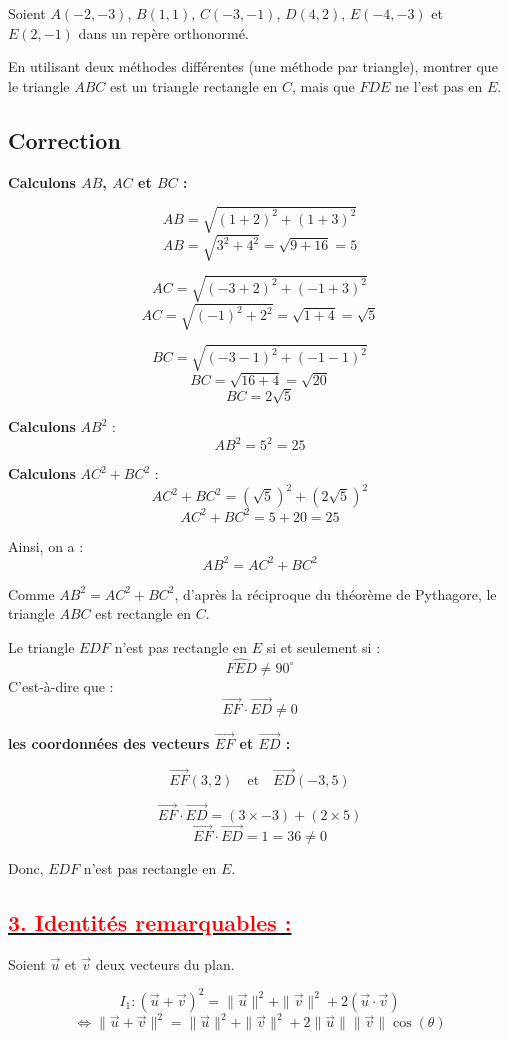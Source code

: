 \documentclass[12pt,a4paper]{article}
\begin{document}
Soient $A(-2, -3)$, $B(1, 1)$, $C(-3, -1)$, $D(4, 2)$, $E(-4, -3)$ et $E(2, -1)$ dans un repère orthonormé.

En utilisant deux méthodes différentes (une méthode par triangle), montrer que le triangle $ABC$ est un triangle rectangle en $C$, mais que $FDE$ ne l'est pas en $E$.
\subsection*{Correction}
\textbf{Calculons $AB$, $AC$ et $BC$ :}

\[
AB = \sqrt{(1 + 2)^2 + (1 + 3)^2}
\]
\[
AB = \sqrt{3^2 + 4^2} = \sqrt{9 + 16} = 5
\]

\[
AC = \sqrt{(-3 + 2)^2 + (-1 + 3)^2}
\]
\[
AC = \sqrt{(-1)^2 + 2^2} = \sqrt{1 + 4} = \sqrt{5}
\]

\[
BC = \sqrt{(-3 - 1)^2 + (-1 - 1)^2}
\]
\[
BC = \sqrt{16 + 4} = \sqrt{20}
\]
\[
BC = 2\sqrt{5}
\]

\textbf{Calculons} $AB^2$ :
\[
AB^2 = 5^2 = 25
\]

\textbf{Calculons} $AC^2 + BC^2$ :
\[
AC^2 + BC^2 = (\sqrt{5})^2 + (2\sqrt{5})^2
\]
\[
AC^2 + BC^2 = 5 + 20 = 25
\]

Ainsi, on a :
\[
AB^2 = AC^2 + BC^2
\]

Comme $AB^2 = AC^2 + BC^2$, d'après la réciproque du théorème de Pythagore, le triangle $ABC$ est rectangle en $C$.

Le triangle $EDF$ n'est pas rectangle en $E$ si et seulement si :
\[
\widehat{FED} \neq 90^\circ
\]
C'est-à-dire que :
\[
\vec{EF} \cdot \vec{ED} \neq 0
\]

\textbf{les coordonnées des vecteurs $\vec{EF}$ et $\vec{ED}$ :}

\[
\vec{EF}(3, 2) \quad \text{et} \quad \vec{ED}(-3, 5)
\]

\[
\vec{EF} \cdot \vec{ED} = (3 \times -3) + (2 \times 5)
\]
\[
\vec{EF} \cdot \vec{ED} = 1 = 36 \neq 0
\]

Donc, $EDF$ n'est pas rectangle en $E$.


\subsection*{\underline{\textbf{\textcolor{red}{3. Identités remarquables : }}}}

Soient $\vec{u}$ et $\vec{v}$ deux vecteurs du plan.

\[
I_1 : (\vec{u} + \vec{v})^2 = \|\vec{u}\|^2 + \|\vec{v}\|^2 + 2(\vec{u} \cdot \vec{v})
\]
\[
\iff \|\vec{u} + \vec{v}\|^2 = \|\vec{u}\|^2 + \|\vec{v}\|^2 + 2\|\vec{u}\|\|\vec{v}\| \cos(\theta)
\]
\end{document}
